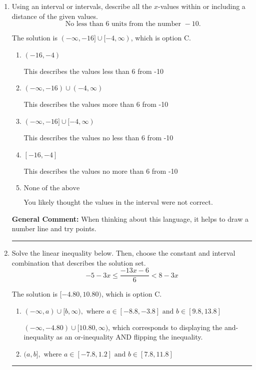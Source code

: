 \documentclass{extbook}[14pt]
\newcommand{\litem}[1]{\item #1

\rule{\textwidth}{0.4pt}}
\begin{document}
\begin{enumerate}
{\begin{enumerate}[label=\Alph*.]
This describes the values less than 3 from 4
\item \( \text{None of the above} \)

You likely thought the values in the interval were not correct.
\end{enumerate}

\textbf{General Comment:} When thinking about this language, it helps to draw a number line and try points.
}
\litem{
Using an interval or intervals, describe all the $x$-values within or including a distance of the given values.
\[ \text{ No less than } 6 \text{ units from the number } -10. \]

The solution is \( (-\infty, -16] \cup [-4, \infty) \), which is option C.\begin{enumerate}[label=\Alph*.]
\item \( (-16, -4) \)

This describes the values less than 6 from -10
\item \( (-\infty, -16) \cup (-4, \infty) \)

This describes the values more than 6 from -10
\item \( (-\infty, -16] \cup [-4, \infty) \)

This describes the values no less than 6 from -10
\item \( [-16, -4] \)

This describes the values no more than 6 from -10
\item \( \text{None of the above} \)

You likely thought the values in the interval were not correct.
\end{enumerate}

\textbf{General Comment:} When thinking about this language, it helps to draw a number line and try points.
}
\litem{
Solve the linear inequality below. Then, choose the constant and interval combination that describes the solution set.
\[ -5 - 3 x \leq \frac{-13 x - 6}{6} < 8 - 3 x \]

The solution is \( [-4.80, 10.80) \), which is option C.\begin{enumerate}[label=\Alph*.]
\item \( (-\infty, a) \cup [b, \infty), \text{ where } a \in [-8.8, -3.8] \text{ and } b \in [9.8, 13.8] \)

$(-\infty, -4.80) \cup [10.80, \infty)$, which corresponds to displaying the and-inequality as an or-inequality AND flipping the inequality.
\item \( (a, b], \text{ where } a \in [-7.8, 1.2] \text{ and } b \in [7.8, 11.8] \)


\end{enumerate}}
\end{enumerate}
\end{document}
